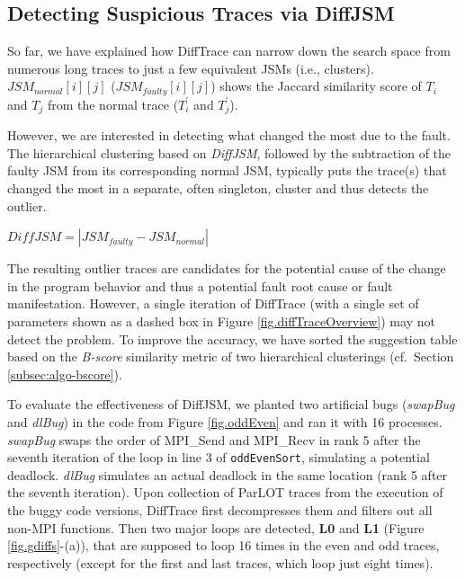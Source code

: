 \subsection{Detecting Suspicious Traces via DiffJSM}
So far, we have explained how DiffTrace can narrow down the search space from numerous long traces to just a few equivalent JSMs (i.e., clusters).
%
$JSM_{normal}[i][j]$ ($JSM_{faulty}[i][j]$) shows the Jaccard similarity score of $T_i$ and $T_j$ from the normal trace ($T_i^\prime$ and $T_j^\prime$).

However, we are interested in detecting what changed the most due to the fault.
%
The hierarchical clustering based on \textit{DiffJSM}, followed by the subtraction of the faulty JSM from its corresponding normal JSM, typically puts the trace(s) that changed the most in a separate, often singleton, cluster and thus detects the outlier.

$DiffJSM = |JSM_{faulty} - JSM_{normal}|$

% 
The resulting outlier traces are candidates for the potential cause of the change in the program behavior and thus a potential fault root cause or fault manifestation.
%
However, a single iteration of DiffTrace (with a single set of parameters shown as a dashed box in Figure \ref{fig.diffTraceOverview}) may not detect the problem. 
%
%
To improve the accuracy, we have sorted the suggestion table based on the \textit{B-score} similarity metric of two hierarchical clusterings \cite{fowlkes83} (cf.~Section \ref{subsec:algo-bscore}).

To evaluate the effectiveness of DiffJSM, we planted two artificial bugs (\textit{swapBug} and \textit{dlBug}) in the code from Figure \ref{fig.oddEven} and ran it with 16 processes.
%
\textit{swapBug} swaps the order of MPI\_Send and MPI\_Recv in rank 5 after the seventh iteration of the loop in line 3 of \texttt{oddEvenSort}, simulating a potential deadlock. \textit{dlBug} simulates an actual deadlock in the same location (rank 5 after the seventh iteration).
%
Upon collection of ParLOT traces from the execution of the buggy code versions, DiffTrace first decompresses them and filters out all non-MPI functions.
Then two major loops are detected, \textbf{L0} and \textbf{L1} (Figure \ref{fig.gdiffs}-(a)), that are supposed to loop 16 times in the even and odd traces, respectively (except for the first and last traces, which loop just eight times).

